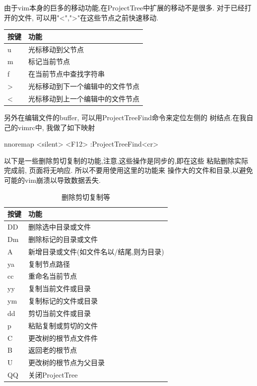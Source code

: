 \documentclass[oneside,openany]{book}
\begin{document}
  由于vim本身的巨多的移动功能,在ProjectTree中扩展的移动不是很多. 对于已经打开的文件,
可以用"<",">"在这些节点之前快速移动.
  \begin{table}[H]
  \centering
      \begin{tabular}{p{40pt}p{220pt}}
        \toprule
        按键& 功能\\
        \midrule
          u     &光标移动到父节点\\
          m     &标记当前节点\\
          f     &在当前节点中查找字符串\\
          >     &光标移动到下一个编辑中的文件节点\\
          <     &光标移动到上一个编辑中的文件节点\\
      \bottomrule
      \end{tabular}
  \end{table}
  另外在编辑文件的buffer, 可以用ProjectTreeFind命令来定位左侧的
树结点.\newline 在我自己的vimrc中, 我做了如下映射
  \begin{mdframed}[style=SmallFrame]
    \begin{flushleft}
      nnoremap <silent> <F12> :ProjectTreeFind<cr>
    \end{flushleft}
  \end{mdframed}

  以下是一些删除剪切复制的功能,注意,这些操作是同步的,即在这些
粘贴删除实际完成前, 页面将无响应. 所以不要用使用这里的功能来
操作大的文件和目录,以避免可能的vim崩溃以导致数据丢失.
  \begin{table}[H]
  \caption{删除剪切复制等}
  \centering
      \begin{tabular}{p{40pt}p{220pt}}
        \toprule
        按键& 功能\\
        \midrule
          DD    &删除选中目录或文件\\
          Dm    &删除标记的目录或文件\\
          A     &新增目录或文件(如文件名以/结尾,则为目录)\\
          ya    &复制节点路径\\
          cc    &重命名当前节点\\
          yy    &复制当前文件或目录\\
          ym    &复制标记的文件或目录\\
          dd    &剪切当前文件或目录\\
          p     &粘贴复制或剪切的文件\\
          C     &更改树的根节点文件件\\
          B     &返回老的根节点\\
          U     &更改树的根节点为父目录\\
          QQ    &关闭ProjectTree\\
        \bottomrule
      \end{tabular}
  \end{table}
\end{document}
